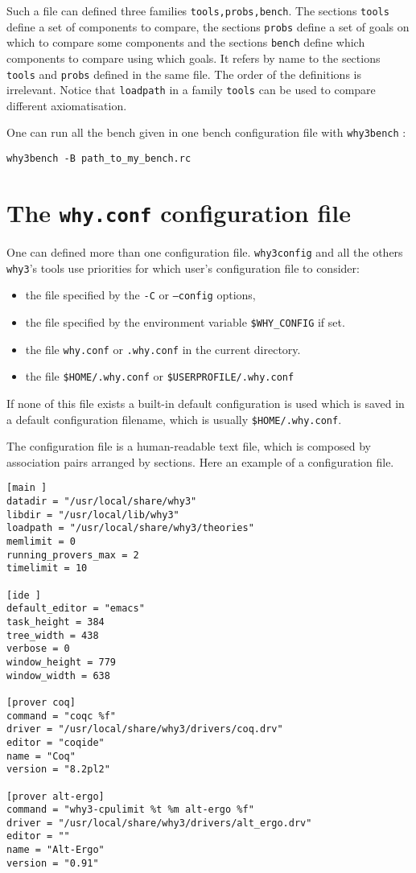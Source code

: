 Such a file can defined three families \texttt{tools,probs,bench}. The
sections \texttt{tools} define a set of components to compare, the
sections \texttt{probs} define a set of goals on which to compare some
components and the sections \texttt{bench} define which components to
compare using which goals. It refers by name to the sections
\texttt{tools} and \texttt{probs} defined in the same file. The order
of the definitions is irrelevant. Notice that \texttt{loadpath} in a family
\texttt{tools} can be used to compare different axiomatisation.

One can run all the bench given in one bench configuration file with
\texttt{why3bench} :
\begin{verbatim}
why3bench -B path_to_my_bench.rc
\end{verbatim}

\section{The \texttt{why.conf} configuration file}
\label{sec:whyconffile}
One can defined more than one configuration file. \texttt{why3config}
and all the others \texttt{why3}'s tools use priorities for which
user's configuration file to consider:
\begin{itemize}
\item the file specified by the \texttt{-C} or \texttt{--config} options,
\item the file specified by the environment variable
  \texttt{\$WHY\_CONFIG} if set.
\item the file \texttt{why.conf} or \texttt{.why.conf} in the current
  directory.
\item the file \texttt{\$HOME/.why.conf} or \texttt{\$USERPROFILE/.why.conf}
\end{itemize}
If none of this file exists a built-in default configuration is used
which is saved in a default configuration filename, which is usually
\texttt{\$HOME/.why.conf}.

The configuration file is a human-readable text file, which is
composed by association pairs arranged by sections. Here an example of
a configuration file.

\begin{verbatim}
[main ]
datadir = "/usr/local/share/why3"
libdir = "/usr/local/lib/why3"
loadpath = "/usr/local/share/why3/theories"
memlimit = 0
running_provers_max = 2
timelimit = 10

[ide ]
default_editor = "emacs"
task_height = 384
tree_width = 438
verbose = 0
window_height = 779
window_width = 638

[prover coq]
command = "coqc %f"
driver = "/usr/local/share/why3/drivers/coq.drv"
editor = "coqide"
name = "Coq"
version = "8.2pl2"

[prover alt-ergo]
command = "why3-cpulimit %t %m alt-ergo %f"
driver = "/usr/local/share/why3/drivers/alt_ergo.drv"
editor = ""
name = "Alt-Ergo"
version = "0.91"
\end{verbatim}

